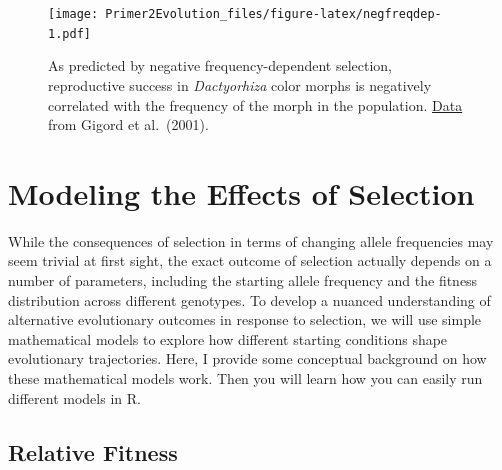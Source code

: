 \documentclass[
]{book}
\begin{document}
\begin{figure}
\centering
\texttt{[image: Primer2Evolution\_files/figure-latex/negfreqdep-1.pdf]}
\caption{\label{fig:negfreqdep}As predicted by negative frequency-dependent selection, reproductive success in \emph{Dactyorhiza} color morphs is negatively correlated with the frequency of the morph in the population. \href{data/5_negfreqdep.csv}{Data} from Gigord et al.~(2001).}
\end{figure}

\hypertarget{modeling-the-effects-of-selection}{%
\section{Modeling the Effects of Selection}\label{modeling-the-effects-of-selection}}

While the consequences of selection in terms of changing allele frequencies may seem trivial at first sight, the exact outcome of selection actually depends on a number of parameters, including the starting allele frequency and the fitness distribution across different genotypes. To develop a nuanced understanding of alternative evolutionary outcomes in response to selection, we will use simple mathematical models to explore how different starting conditions shape evolutionary trajectories. Here, I provide some conceptual background on how these mathematical models work. Then you will learn how you can easily run different models in R.

\hypertarget{relative-fitness}{%
\subsection{Relative Fitness}\label{relative-fitness}}
\end{document}
